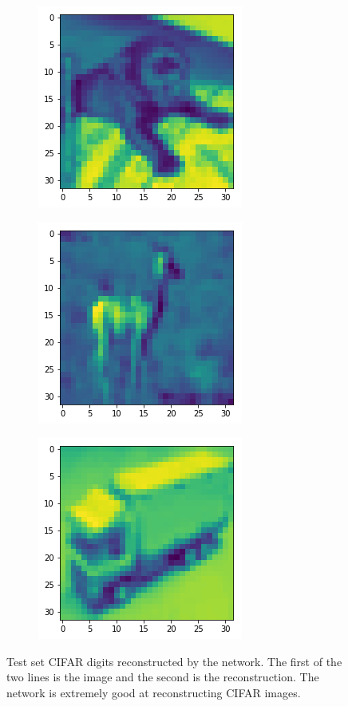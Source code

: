 \begin{figure}[H]
\bigskip
\begin{subfigure}{.3\linewidth}
 \centering
 \includegraphics[scale=0.4]{chapter_3_figures/cifar_chimp_test.png}
\end{subfigure}
 \hfill
\begin{subfigure}{.3\linewidth}
 \centering
 \includegraphics[scale=0.4]{chapter_3_figures/cifar_gazelle_test.png}
\end{subfigure}
 \hfill
\begin{subfigure}{.3\linewidth}
 \centering
 \includegraphics[scale=0.4]{chapter_3_figures/cifar_lorry_test.png}
\end{subfigure}
\caption{Test set CIFAR digits reconstructed by the network. The first of the two lines is the image and the second is the reconstruction. The network is extremely good at reconstructing CIFAR images.}
\end{figure}

